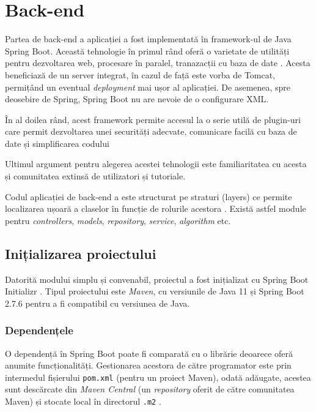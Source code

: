 \chapter{Back-end}

Partea de back-end a aplicației \thesistitle{} a fost implementată în framework-ul de Java Spring Boot. Această tehnologie în primul rând oferă o varietate de utilități pentru dezvoltarea web, procesare în paralel, tranazacții cu baza de date \cite{spring-boot-pros-cons}. Acesta beneficiază de un server integrat, în cazul de față este vorba de Tomcat, permițând un eventual \textit{deployment} mai ușor al aplicației. De asemenea, spre deosebire de Spring, Spring Boot nu are nevoie de o configurare XML.

În al doilea rând, acest framework permite accesul la o serie utilă de plugin-uri care permit dezvoltarea unei securități adecvate, comunicare facilă cu baza de date și simplificarea codului

Ultimul argument pentru alegerea acestei tehnologii este familiaritatea cu acesta și comunitatea extinsă de utilizatori și tutoriale.

Codul aplicației de back-end a \thesistitle{} este structurat pe straturi (layers) ce permite localizarea ușoară a claselor în funcție de rolurile acestora \cite{spring-boot-code-structure}. Există astfel module pentru \textit{controllers}, \textit{models}, \textit{repository}, \textit{service}, \textit{algorithm} etc.

\section{Inițializarea proiectului}

Datorită modului simplu și convenabil, proiectul a fost inițializat cu Spring Boot Initializr \cite{spring-boot-initializr}. Tipul proiectului este \textit{Maven}, cu versiunile de Java 11 și Spring Boot 2.7.6 pentru a fi compatibil cu versiunea de Java.

\subsection{Dependențele}

O dependență în Spring Boot poate fi comparată cu o librărie deoarece oferă anumite funcționalități. Gestionarea acestora de către programator este prin intermedul fișierului \texttt{pom.xml} (pentru un proiect Maven), odată adăugate, acestea sunt descărcate din \textit{Maven Central} (un \textit{repository} oferit de către comunitatea Maven) și stocate local în directorul \texttt{.m2} \cite{spring-boot-deps}.

